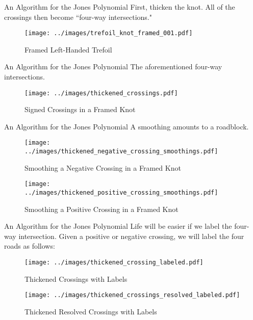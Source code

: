 \documentclass{beamer}
\begin{document}
    \begin{frame}{An Algorithm for the Jones Polynomial}
        First, thicken the knot. All of the crossings then become
        ``four-way intersections."
        \begin{figure}
            \centering
            \texttt{[image: ../images/trefoil\_knot\_framed\_001.pdf]}
            \caption{Framed Left-Handed Trefoil}
            \label{fig:trefoil_knot_framed_001}
        \end{figure}
    \end{frame}
    \begin{frame}{An Algorithm for the Jones Polynomial}
        The aforementioned four-way intersections.
        \begin{figure}
            \centering
            \texttt{[image: ../images/thickened\_crossings.pdf]}
            \caption{Signed Crossings in a Framed Knot}
            \label{fig:thickened_crossings}
        \end{figure}
    \end{frame}
    \begin{frame}{An Algorithm for the Jones Polynomial}
        A smoothing amounts to a roadblock.
        \begin{figure}
            \centering
            \texttt{[image: ../images/thickened\_negative\_crossing\_smoothings.pdf]}
            \caption{Smoothing a Negative Crossing in a Framed Knot}
            \label{fig:thickened_negative_crossing_smoothings}
        \end{figure}
        \begin{figure}
            \centering
            \texttt{[image: ../images/thickened\_positive\_crossing\_smoothings.pdf]}
            \caption{Smoothing a Positive Crossing in a Framed Knot}
            \label{fig:thickened_positive_crossing_smoothings}
        \end{figure}
    \end{frame}
    \begin{frame}{An Algorithm for the Jones Polynomial}
        Life will be easier if we label the four-way intersection. Given a
        positive or negative crossing, we will label the four roads as follows:
        \begin{figure}
            \centering
            \texttt{[image: ../images/thickened\_crossing\_labeled.pdf]}
            \caption{Thickened Crossings with Labels}
            \label{fig:thickened_crossings_labeled}
        \end{figure}
        \begin{figure}
            \centering
            \texttt{[image: ../images/thickened\_crossings\_resolved\_labeled.pdf]}
            \caption{Thickened Resolved Crossings with Labels}
            \label{fig:thickened_crossings_resolved_labeled}
        \end{figure}
    \end{frame}
\end{document}
